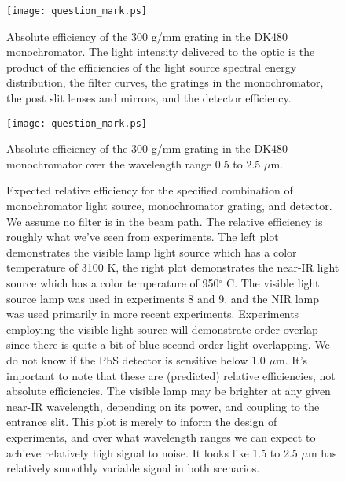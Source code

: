 

\begin{figure}
\begin{center}
    \texttt{[image: question\_mark.ps]}
  \end{center}
  \caption[Absolute efficiency of the 300 g/mm grating in the DK480 monochromator]{Absolute efficiency of the 300 g/mm grating in the DK480 monochromator.  The light intensity delivered to the optic is the product of the efficiencies of the light source spectral energy distribution, the filter curves, the gratings in the monochromator, the post slit lenses and mirrors, and the detector efficiency.}
\end{figure}

\begin{figure}
\begin{center}
    \texttt{[image: question\_mark.ps]}
  \end{center}
  \caption[Absolute efficiency of the 300 g/mm grating in the DK480 monochromator, part II. ]{Absolute efficiency of the 300 g/mm grating in the DK480 monochromator over the wavelength range 0.5 to 2.5 $\mu$m.}
\end{figure}

\begin{figure}
  \centering
  \caption[Predicted relative spectral efficiency of experimental setup- visible and near-IR]{Expected relative efficiency for the specified combination of monochromator light source, monochromator grating, and detector.  We assume no filter is in the beam path.  The relative efficiency is roughly what we've seen from experiments.  The left plot demonstrates the visible lamp light source which has a color temperature of 3100 K, the right plot demonstrates the near-IR light source which has a color temperature of 950$^\circ$ C.  The visible light source lamp was used in experiments 8 and 9, and the NIR lamp was used primarily in more recent experiments.  Experiments employing the visible light source will demonstrate order-overlap since there is quite a bit of blue second order light overlapping.  We do not know if the PbS detector is sensitive below 1.0 $\mu$m.  It's important to note that these are (predicted) relative efficiencies, not absolute efficiencies.  The visible lamp may be brighter at any given near-IR wavelength, depending on its power, and coupling to the entrance slit.  This plot is merely to inform the design of experiments, and over what wavelength ranges we can expect to achieve relatively high signal to noise.  It looks like 1.5 to 2.5 $\mu$m has relatively smoothly variable signal in both scenarios.}
  \label{fig:GTA_layout}
\end{figure}


